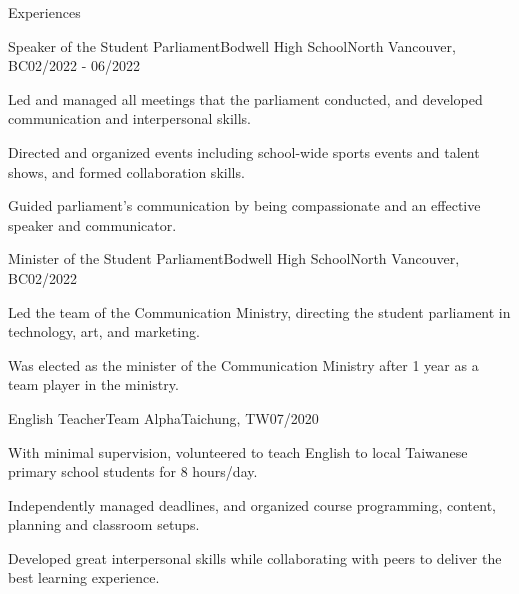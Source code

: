 \documentclass{article}
\newlength{\tabin}
\newlength{\secsep}
\newcommand{\lineunder}{\vspace*{-8pt} \\ \hspace*{-6pt} \hrulefill \\ \vspace*{-15pt}}
\newenvironment{tabbedsection}[1]{
  \begin{list}{}{
      \setlength{\itemsep}{0pt}
      \setlength{\labelsep}{0pt}
      \setlength{\labelwidth}{0pt}
      \setlength{\leftmargin}{\tabin}
      \setlength{\rightmargin}{\tabin}
      \setlength{\listparindent}{0pt}
      \setlength{\parsep}{0pt}
      \setlength{\parskip}{0pt}
      \setlength{\partopsep}{0pt}
      \setlength{\topsep}{#1}
    }
  \item[]
}{\end{list}}
\newenvironment{resume_section}[1]{
  \filbreak
  \vspace{2\secsep}
  \textsc{\large#1}
  \lineunder
  \begin{tabbedsection}{\secsep}
}{\end{tabbedsection}}
\newenvironment{subitems}{
  \renewcommand{\labelitemi}{-}
  \begin{itemize}
      \setlength{\labelsep}{1em}
}{\end{itemize}}
\newenvironment{resume_employer}[4]{
  \vspace{\secsep}
  \textbf{#1} {\footnotesize #3} \hfill {\footnotesize#4} \hspace{-1em} \\
  \small{#2}  
  \vspace{\secsep}
  \begin{tabbedsection}{0pt}
  \begin{subitems}
}{\end{subitems}\end{tabbedsection}}
\begin{document}
\begin{resume_section}{Experiences}
  \begin{resume_employer}{Speaker of the Student Parliament}{Bodwell High School}{North Vancouver, BC}{02/2022 - 06/2022}
    \item Led and managed all meetings that the parliament conducted, and developed communication and interpersonal skills. 
    \item Directed and organized events including school-wide sports events and talent shows, and formed collaboration skills.
    \item Guided parliament's communication by being compassionate and an effective speaker and communicator.
  \end{resume_employer}

  \begin{resume_employer}{Minister of the Student Parliament}{Bodwell High School}{North Vancouver, BC}{02/2022}
    \item Led the team of the Communication Ministry, directing the student parliament in technology, art, and marketing.
    \item Was elected as the minister of the Communication Ministry after 1 year as a team player in the ministry.
  \end{resume_employer}

  \begin{resume_employer}{English Teacher}{Team Alpha}{Taichung, TW}{07/2020}
    \item  With minimal supervision, volunteered to teach English to local Taiwanese primary school students for 8 hours/day.
    \item Independently managed deadlines, and organized course programming, content, planning and classroom setups. 
    \item Developed great interpersonal skills while collaborating with peers to deliver the best learning experience.
  \end{resume_employer}

\end{resume_section}
  
\end{document}
